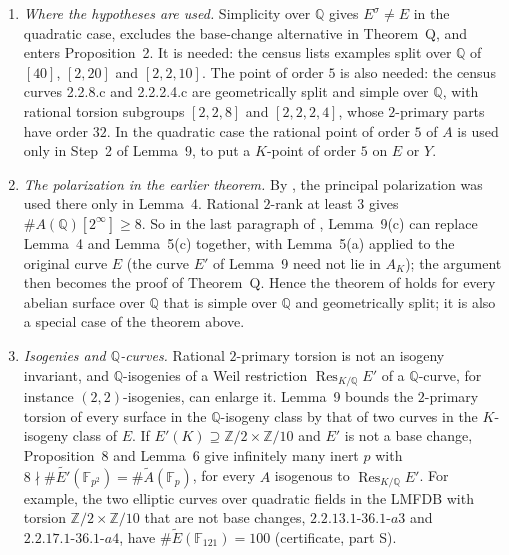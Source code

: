 \documentclass[11pt]{article}
\newcommand{\Q}{\mathbb Q}
\newcommand{\Z}{\mathbb Z}
\newcommand{\F}{\mathbb F}
\DeclareMathOperator{\Res}{Res}
\begin{document}
\begin{enumerate}
\item \emph{Where the hypotheses are used.} Simplicity over \(\Q\) gives \(E^\sigma\neq E\) in the
quadratic case, excludes the base-change alternative in Theorem~Q, and enters
Proposition~2. It is needed: the census lists examples split over \(\Q\) of \([40]\), \([2,20]\) and
\([2,2,10]\). The point of order \(5\) is also needed: the census curves 2.2.8.c and 2.2.2.4.c are
geometrically split and simple over \(\Q\), with rational torsion subgroups \([2,2,8]\) and
\([2,2,2,4]\), whose \(2\)-primary parts have order \(32\). In the quadratic case the rational point of
order \(5\) of \(A\) is used only in Step~2 of Lemma~9, to put a \(K\)-point of order \(5\) on \(E\) or
\(Y\).

\item \emph{The polarization in the earlier theorem.} By \cite[Remark~3]{P2210}, the principal
polarization was used there only in Lemma~4. Rational \(2\)-rank at least \(3\) gives
\(\#A(\Q)[2^\infty]\ge8\). So in the last paragraph of \cite[Section~5]{P2210}, Lemma~9(c) can
replace Lemma~4 and Lemma~5(c) together, with Lemma~5(a) applied to the original curve \(E\) (the
curve \(E'\) of Lemma~9 need not lie in \(A_K\)); the argument then becomes the proof of Theorem~Q.
Hence the theorem of \cite{P2210} holds for every abelian surface over \(\Q\)
that is simple over \(\Q\) and geometrically split; it is also a special case of the theorem above.

\item \emph{Isogenies and \(\Q\)-curves.} Rational \(2\)-primary torsion is not an isogeny invariant,
and \(\Q\)-isogenies of a Weil restriction \(\Res_{K/\Q}E'\) of a \(\Q\)-curve, for instance
\((2,2)\)-isogenies, can enlarge it. Lemma~9 bounds the \(2\)-primary torsion of every surface in
the \(\Q\)-isogeny class by that of two curves in the \(K\)-isogeny class of \(E\). If
\(E'(K)\supseteq\Z/2\times\Z/10\) and \(E'\) is not a base change, Proposition~8 and Lemma~6 give
infinitely many inert \(p\) with \(8\nmid\#\widetilde{E'}(\F_{p^2})=\#\widetilde A(\F_p)\), for every
\(A\) isogenous to \(\Res_{K/\Q}E'\). For example, the two elliptic curves over quadratic fields in the
LMFDB with torsion \(\Z/2\times\Z/10\) that are not base changes, \(2.2.13.1\text{-}36.1\text{-}a3\) and
\(2.2.17.1\text{-}36.1\text{-}a4\), have \(\#\widetilde E(\F_{121})=100\) (certificate, part S).


\end{enumerate}
\end{document}
